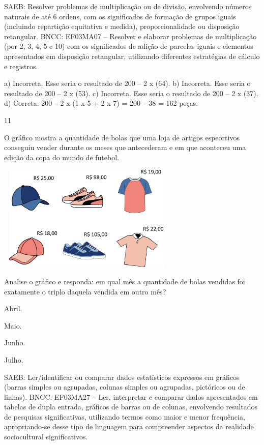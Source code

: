 {\begin{escolha}
{SAEB: Resolver problemas de multiplicação ou de divisão, envolvendo números naturais de até 6 ordens, com os significados de formação de grupos iguais (incluindo repartição equitativa e medida), proporcionalidade ou disposição retangular.
BNCC: EF03MA07 – Resolver e elaborar problemas de multiplicação (por 2, 3, 4, 5 e 10) com os
significados de adição de parcelas iguais e elementos apresentados em disposição retangular, utilizando diferentes estratégias de cálculo e registros.

a) Incorreta. Esse seria o resultado de 200 -- 2 x (64).
b) Incorreta. Esse seria o resultado de 200 -- 2 x (53).
c) Incorreta. Esse seria o resultado de 200 -- 2 x (37).
d) Correta. 200 -- 2 x (1 x 5 + 2 x 7) = 200 -- 38 = 162 peças.

\num{11}

O gráfico mostra a quantidade de bolas que uma loja de artigos espeortivos conseguiu vender durante os meses que antecederam e em que aconteceu uma edição da copa do mundo de futebol.


\includegraphics[width=3.36538in,height=2.00040in]{media/image120.png}

Analise o gráfico e responda: em qual mês a quantidade de bolas vendidas foi exatamente o triplo daquela vendida em outro mês?

\begin{escolha}
\item
  Abril.
\item
  Maio.
\item
  Junho.
\item
  Julho.
\end{escolha}

SAEB: Ler/identificar ou comparar dados estatísticos
expressos em gráficos (barras simples ou agrupadas, colunas simples ou agrupadas, pictóricos ou de linhas).
BNCC: EF03MA27 -- Ler, interpretar e comparar dados apresentados em tabelas de dupla entrada,
gráficos de barras ou de colunas, envolvendo resultados de pesquisas significativas, utilizando
termos como maior e menor frequência, apropriando-se desse tipo de linguagem para compreender aspectos da realidade sociocultural significativos.

}
\end{escolha}}
